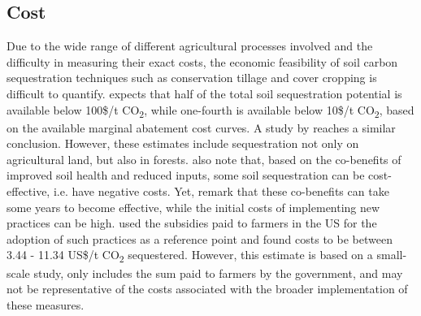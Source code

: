 \subsection*{Cost}
Due to the wide range of different agricultural processes involved and the difficulty in measuring their exact costs, the economic feasibility of soil carbon sequestration techniques such as conservation tillage and cover cropping is difficult to quantify. \textcite{Bossio2020TheSolutions} expects that half of the total soil sequestration potential is available below 100\$/t CO\textsubscript{2}, while one-fourth is available below 10\$/t CO\textsubscript{2}, based on the available marginal abatement cost curves. A study by \textcite{McKinsey2009PathwaysEconomy} reaches a similar conclusion. However, these estimates include sequestration not only on agricultural land, but also in forests. \textcite{Bossio2020TheSolutions} also note that, based on the co-benefits of improved soil health and reduced inputs, some soil sequestration can be cost-effective, i.e. have negative costs. Yet, \textcite{Zoebisch2022SoilMoonshot} remark that these co-benefits can take some years to become effective, while the initial costs of implementing new practices can be high.
\textcite{Chambers2016SoilInitiative} used the subsidies paid to farmers in the US for the adoption of such practices as a reference point and found costs to be between 3.44 - 11.34 US\$/t CO\textsubscript{2} sequestered. However, this estimate is based on a small-scale study, only includes the sum paid to farmers by the government, and may not be representative of the costs associated with the broader implementation of these measures.

